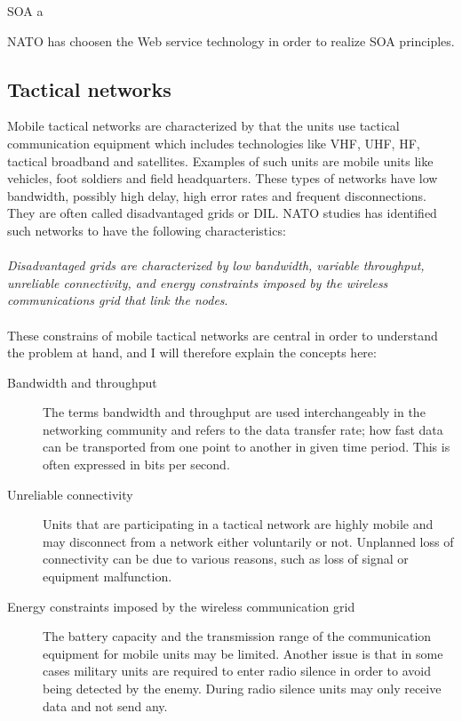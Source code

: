 \documentclass[USenglish]{article}
\begin{document}
SOA a

NATO has choosen the Web service technology in order to realize SOA principles.

\subsection{Tactical networks}
Mobile tactical networks are characterized by that the units use tactical
communication equipment which includes technologies like VHF, UHF, HF, tactical
broadband and satellites. Examples of such units are mobile units like vehicles,
foot soldiers and field headquarters. These types of networks have low
bandwidth, possibly high delay, high error rates and frequent disconnections.
They are often called disadvantaged grids or DIL. NATO studies has
identified such networks to have the following characteristics:

\paragraph{}
\textit{Disadvantaged grids are characterized by low bandwidth, variable
throughput, unreliable connectivity, and energy constraints imposed by the
wireless communications grid that link the
nodes}\cite{nato-disadvantaged-grids}.

\paragraph{}
These constrains of mobile tactical networks are central in order to understand the problem at hand, and I will therefore explain the concepts here:

\begin{description}
\item[Bandwidth and throughput] The terms bandwidth and throughput are used interchangeably in the networking community and refers to the data transfer rate; how fast data can be transported from one point to another in given time period. This is often expressed in bits per second.
\item[Unreliable connectivity] Units that are participating in a tactical network are highly mobile and may disconnect from a network either voluntarily or not. Unplanned loss of connectivity can be due to various reasons, such as loss of signal or equipment malfunction.
\item[Energy constraints imposed by the wireless communication grid] The battery capacity and the transmission range of the communication equipment for mobile units may be limited. Another issue is that in some cases military units are required to enter radio silence in order to avoid being detected by the enemy. During radio silence units may only receive data and not send any.
\end{description}
\end{document}
